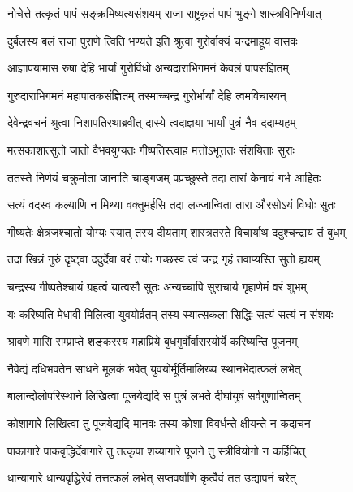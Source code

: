 \twolineshloka
{नोचेत्ते तत्कृतं पापं सङ्क्रमिष्यत्यसंशयम्}
{राजा राष्ट्रकृतं पापं भुङ्गे शास्त्रविनिर्णयात्} %

\twolineshloka
{दुर्बलस्य बलं राजा पुराणे त्विति भण्यते}
{इति श्रुत्वा गुरोर्वाक्यं चन्द्रमाहूय वासवः} %

\twolineshloka
{आज्ञापयामास रुषा देहि भार्यां गुरोर्विधो}
{अन्यदाराभिगमनं केवलं पापसंज्ञितम्} %

\twolineshloka
{गुरुदाराभिगमनं महापातकसंज्ञितम्}
{तस्माच्चन्द्र गुरोर्भार्यां देहि त्वमविचारयन्} %

\twolineshloka
{देवेन्द्रवचनं श्रुत्वा निशापतिरथाब्रवीत्}
{दास्ये त्वदाज्ञया भार्यां पुत्रं नैव ददाम्यहम्} %

\twolineshloka
{मत्सकाशात्सुतो जातो वैभवयुग्यतः}
{गीष्पतिस्त्वाह मत्तोऽभूत्ततः संशयिताः सुराः} %

\twolineshloka
{ततस्ते निर्णयं चक्रुर्माता जानाति चाङ्गजम्}
{पप्रच्छुस्ते तदा तारां केनायं गर्भ आहितः} %

\twolineshloka
{सत्यं वदस्व कल्याणि न मिथ्या वक्तुमर्हसि}
{तदा लज्जान्विता तारा औरसोऽयं विधोः सुतः} %

\twolineshloka
{गीष्यतेः क्षेत्रजश्चातो योग्यः स्यात् तस्य दीयताम्}
{शास्त्रतस्ते विचार्याथ ददुश्चन्द्राय तं बुधम्} %

\twolineshloka
{तदा खिन्नं गुरुं दृष्ट्वा ददुर्देवा वरं तयोः}
{गच्छस्व त्वं चन्द्र गृहं तवाप्यस्ति सुतो ह्ययम्} %

\twolineshloka
{चन्द्रस्य गीष्पतेश्चायं ग्रहत्वं यात्वसौ सुतः}
{अन्यच्चापि सुराचार्य गृहाणेमं वरं शुभम्} %

\twolineshloka
{यः करिष्यति मेधावी मिलित्वा युवयोर्व्रतम्}
{तस्य स्यात्सकला सिद्धिः सत्यं सत्यं न संशयः} %

\twolineshloka
{श्रावणे मासि सम्प्राप्ते शङ्करस्य महाप्रिये}
{बुधगुर्वोर्वासरयोर्ये करिष्यन्ति पूजनम्} %

\twolineshloka
{नैवेद्यं दधिभक्तेन साधने मूलकं भवेत्}
{युवयोर्मूर्तिमालिख्य स्थानभेदात्फलं लभेत्} %

\twolineshloka
{बालान्दोलोपरिस्थाने लिखित्वा पूजयेद्यदि}
{स पुत्रं लभते दीर्घायुषं सर्वगुणान्वितम्} %

\twolineshloka
{कोशागारे लिखित्वा तु पूजयेद्यदि मानवः}
{तस्य कोशा विवर्धन्ते क्षीयन्ते न कदाचन} %

\twolineshloka
{पाकागारे पाकवृद्धिर्देवागारे तु तत्कृपा}
{शय्यागारे पूजने तु स्त्रीवियोगो न कर्हिचित्} %

\twolineshloka
{धान्यागारे धान्यवृद्धिरेवं तत्तत्फलं लभेत्}
{सप्तवर्षाणि कृत्वैवं तत उद्यापनं चरेत्} %

